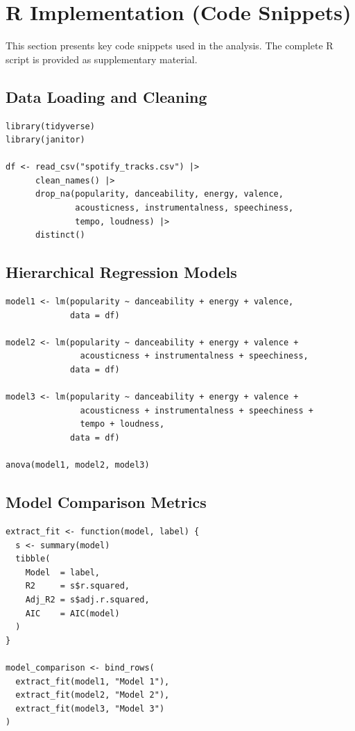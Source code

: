 \documentclass[12pt,a4paper]{article}
\begin{document}
\section{R Implementation (Code Snippets)}

This section presents key code snippets used in the analysis. The complete
R script is provided as supplementary material.

\subsection{Data Loading and Cleaning}

\begin{lstlisting}
library(tidyverse)
library(janitor)

df <- read_csv("spotify_tracks.csv") |>
      clean_names() |>
      drop_na(popularity, danceability, energy, valence,
              acousticness, instrumentalness, speechiness,
              tempo, loudness) |>
      distinct()
\end{lstlisting}   


\subsection{Hierarchical Regression Models}

\begin{lstlisting}  
model1 <- lm(popularity ~ danceability + energy + valence,
             data = df)

model2 <- lm(popularity ~ danceability + energy + valence +
               acousticness + instrumentalness + speechiness,
             data = df)

model3 <- lm(popularity ~ danceability + energy + valence +
               acousticness + instrumentalness + speechiness +
               tempo + loudness,
             data = df)

anova(model1, model2, model3)
\end{lstlisting}


\subsection{Model Comparison Metrics}

\begin{lstlisting}
extract_fit <- function(model, label) {
  s <- summary(model)
  tibble(
    Model  = label,
    R2     = s$r.squared,
    Adj_R2 = s$adj.r.squared,
    AIC    = AIC(model)
  )
}

model_comparison <- bind_rows(
  extract_fit(model1, "Model 1"),
  extract_fit(model2, "Model 2"),
  extract_fit(model3, "Model 3")
)
\end{lstlisting}
\end{document}
